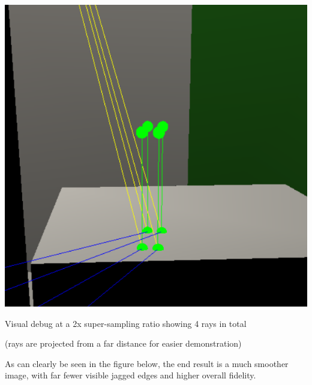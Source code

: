 \documentclass{article}
\begin{document}
    \begin{center}
        \includegraphics[scale=0.75]{images/supersampling_debugger.png}

        {\footnotesize Visual debug at a 2x super-sampling ratio showing 4 rays in total
        
        (rays are projected from a far distance for easier demonstration)\par}
    \end{center}
    As can clearly be seen in the figure below, the end result is a much smoother image, with far fewer 
    visible jagged edges and higher overall fidelity.
\end{document}
